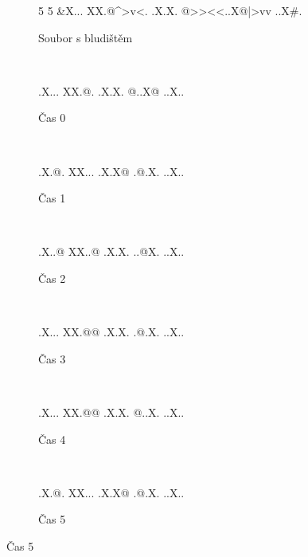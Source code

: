 \begin{figure}
  \centering
  \begin{subfigure}{0.25\textwidth}
    \begin{bansheecastle}
    5 5
    &X...
    XX.@^>v<.
    .X.X.
    @>><<..X@^^<>vv
    ..X#.
    \end{bansheecastle}
    \caption{Soubor s bludištěm}
    \label{fig:banshee-castle-example-file}
  \end{subfigure}
~
  \begin{subfigure}{0.12\textwidth}
    \begin{bansheecastle}
 .X...
 XX.@.
 .X.X.
 @..X@
 ..X..
    \end{bansheecastle}
    \caption{Čas 0}
    \label{fig:banshee-castle-example-step0}
  \end{subfigure}
  ~
  \begin{subfigure}{0.12\textwidth}
    \begin{bansheecastle}
 .X.@.
 XX...
 .X.X@
 .@.X.
 ..X..
    \end{bansheecastle}
    \caption{Čas 1}
    \label{fig:banshee-castle-example-step1}
  \end{subfigure}
  ~
  \begin{subfigure}{0.12\textwidth}
    \begin{bansheecastle}
 .X..@
 XX..@
 .X.X.
 ..@X.
 ..X..
    \end{bansheecastle}
    \caption{Čas 2}
    \label{fig:banshee-castle-example-step2}
  \end{subfigure}
  ~
  \begin{subfigure}{0.12\textwidth}
    \begin{bansheecastle}
 .X...
 XX.@@
 .X.X.
 .@.X.
 ..X..
    \end{bansheecastle}
    \caption{Čas 3}
    \label{fig:banshee-castle-example-step3}
  \end{subfigure}
  ~
  \begin{subfigure}{0.12\textwidth}
    \begin{bansheecastle}
 .X...
 XX.@@
 .X.X.
 @..X.
 ..X..
    \end{bansheecastle}
    \caption{Čas 4}
    \label{fig:banshee-castle-example-step4}
  \end{subfigure}
  ~
  \begin{subfigure}{0.12\textwidth}
    \begin{bansheecastle}
 .X.@.
 XX...
 .X.X@
 .@.X.
 ..X..
    \end{bansheecastle}
    \caption{Čas 5}
    \label{fig:banshee-castle-example-step5}

\end{subfigure}
\end{figure}
